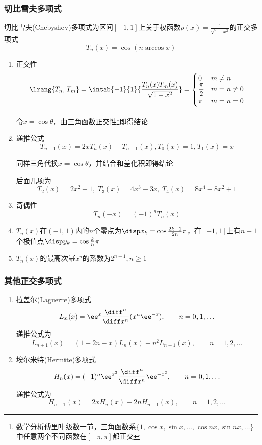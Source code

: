 \subsubsection{切比雪夫多项式}
切比雪夫(Chebyshev)多项式为区间$[-1,1]$上关于权函数$\rho(x)=\frac{1}{\sqrt{1-x^2}}$的正交多项式
\[T_n(x)=\cos(n\arccos x)\]
\begin{enumerate}
    \item 正交性
\[\lrang{T_n,T_m}=\intab{-1}{1}{\frac{T_n(x)T_m(x)}{\sqrt{1-x^2}}}=
\begin{cases}
    0&m\ne n\\
    \dfrac{\pi}{2}&m=n\ne 0\\
    \pi&m=n=0
\end{cases}\]
    \begin{analysis}
        令$x=\cos\theta$，由三角函数正交性\footnote{数学分析傅里叶级数一节，三角函数系$\{1,\cos x,\sin x,\ldots,\cos nx,\sin nx,\ldots\}$中任意两个不同函数在$[-\pi,\pi]$都正交}即得结论
    \end{analysis}
    \item 递推公式
\[T_{n+1}(x)=2xT_n(x)-T_{n-1}(x),T_0(x)=1,T_1(x)=x\]
\begin{analysis}
    同样三角代换$x=\cos\theta$，并结合和差化积即得结论
\end{analysis}
后面几项为
\[T_2(x)=2x^2-1,\;T_3(x)=4x^3-3x,\;T_4(x)=8x^4-8x^2+1\]
    \item 奇偶性
\[T_n(-x)=(-1)^nT_n(x)\]
    \item $T_n(x)$在$(-1,1)$内的$n$个零点为$\disp x_k=\cos\frac{2k-1}{2n}\pi$，在$[-1,1]$上有$n+1$个极值点$\disp y_k=\cos\frac{k}{n}\pi$
    \item $T_n(x)$的最高次幂$x^n$的系数为$2^{n-1},n\geq 1$
\end{enumerate}

\subsubsection{其他正交多项式}
\begin{enumerate}
    \item 拉盖尔(Laguerre)多项式
    \[L_n(x)=\ee^x\frac{\diff^n}{\diff x^n}(x^n\ee^{-x}),\qquad n=0,1,\ldots\]
    递推公式为
    \[L_{n+1}(x)=(1+2n-x)L_n(x)-n^2L_{n-1}(x),\qquad n=1,2,\ldots\]
    \item 埃尔米特(Hermite)多项式
    \[H_n(x)=(-1)^n\ee^{x^2}\frac{\diff^n}{\diff x^n}\ee^{-x^2},\qquad n=0,1,\ldots\]
    递推公式为
    \[H_{n+1}(x)=2xH_n(x)-2nH_{n-1}(x),\qquad n=1,2,\ldots\]
\end{enumerate}

